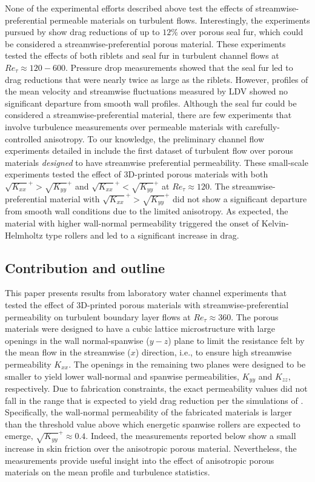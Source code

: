 \documentclass[letterpaper,11pt]{article}
\newcommand{\kpxx}{\sqrt{K_{xx}}^+}
\newcommand{\kpyy}{\sqrt{K_{yy}}^+}
\newcommand{\Ret}{Re_\tau}
\begin{document}
None of the experimental efforts described above test the effects of streamwise-preferential permeable materials on turbulent flows. Interestingly, the experiments pursued by \citet{itoh2006turbulent} show drag reductions of up to $12\%$ over porous seal fur, which could be considered a streamwise-preferential porous material.  These experiments tested the effects of both riblets and seal fur in turbulent channel flows at $\Ret \approx 120-600$. Pressure drop measurements showed that the seal fur led to drag reductions that were nearly twice as large as the riblets.  However, profiles of the mean velocity and streamwise fluctuations measured by LDV showed no significant departure from smooth wall profiles. Although the seal fur could be considered a streamwise-preferential material, there are few experiments that involve turbulence measurements over permeable materials with carefully-controlled anisotropy.  To our knowledge, the preliminary channel flow experiments detailed in \citet{chavarin2020resolvent} include the first dataset of turbulent flow over porous materials \textit{designed} to have streamwise preferential permeability. These small-scale experiments tested the effect of 3D-printed porous materials with both $\kpxx > \kpyy$ and $\kpxx < \kpyy$ at $Re_\tau \approx 120$. The streamwise-preferential material with $\kpxx > \kpyy$ did not show a significant departure from smooth wall conditions due to the limited anisotropy. As expected, the material with higher wall-normal permeability triggered the onset of Kelvin-Helmholtz type rollers and led to a significant increase in drag.

\subsection{Contribution and outline}
This paper presents results from laboratory water channel experiments that tested the effect of 3D-printed porous materials with streamwise-preferential permeability on turbulent boundary layer flows at $\Ret \approx 360$. The porous materials were designed to have a cubic lattice microstructure with large openings in the wall normal-spanwise ($y-z$) plane to limit the resistance felt by the mean flow in the streamwise ($x$) direction, i.e., to ensure high streamwise permeability $K_{xx}$.  The openings in the remaining two planes were designed to be smaller to yield lower wall-normal and spanwise permeabilities, $K_{yy}$ and $K_{zz}$, respectively.  Due to fabrication constraints, the exact permeability values did not fall in the range that is expected to yield drag reduction per the simulations of \citet{gomez2019turbulent}.  Specifically, the wall-normal permeability of the fabricated materials is larger than the threshold value above which energetic spanwise rollers are expected to emerge, $\kpyy \approx 0.4$.  Indeed, the measurements reported below show a small increase in skin friction over the anisotropic porous material. Nevertheless, the measurements provide useful insight into the effect of anisotropic porous materials on the mean profile and turbulence statistics. 
\end{document}
